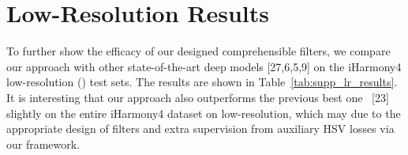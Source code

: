 \documentclass[runningheads]{llncs}
\begin{document}
\begin{table*}[!thb]
        \scriptsize
        \begin{center}
        \end{center}
        \caption{\textbf{Efficiency comparison} between DCCF and advanced post-processing methods on different resolutions from 1024 to 3072. 
        'T-C' represents cpu time (ms), 'T-G' represents gpu time (ms) and 'Mem' represents memory usage (MB).
        Note that '-' means no offical implementation is found.
}
        \vspace{-20pt}
        \label{tab:efficiency}
\end{table*}

\section{Low-Resolution Results}
\label{sec:low-res-results}

To further show the efficacy of our designed comprehensible filters, we compare our approach with other state-of-the-art deep models [27,6,5,9] on the iHarmony4 low-resolution () test sets. 
The results are shown in Table~\ref{tab:supp_lr_results}.
It is interesting that our approach also outperforms the previous best one~ [23] slightly on the entire iHarmony4 dataset on low-resolution, which may due to the appropriate design of filters and extra supervision from auxiliary HSV losses via our framework.
\end{document}
